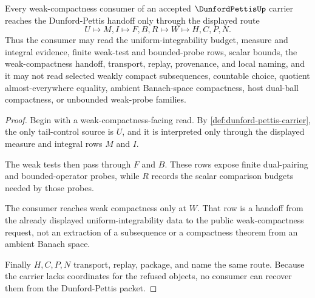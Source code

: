 \begin{theorem}
\label{thm:dunford-pettis-uniform-integrability-handoff}
Every weak-compactness consumer of an accepted $\DunfordPettisUp$ carrier reaches the Dunford-Pettis handoff only through the displayed route
$$
U \longmapsto M,I \longmapsto F,B,R \longmapsto W \longmapsto H,C,P,N .
$$
Thus the consumer may read the uniform-integrability budget, measure and integral evidence, finite weak-test and bounded-probe rows, scalar bounds, the weak-compactness handoff, transport, replay, provenance, and local naming, and it may not read selected weakly compact subsequences, countable choice, quotient almost-everywhere equality, ambient Banach-space compactness, host dual-ball compactness, or unbounded weak-probe families.
\end{theorem}
\begin{proof}
Begin with a weak-compactness-facing read. By \autoref{def:dunford-pettis-carrier}, the only tail-control source is $U$, and it is interpreted only through the displayed measure and integral rows $M$ and $I$.

The weak tests then pass through $F$ and $B$. These rows expose finite dual-pairing and bounded-operator probes, while $R$ records the scalar comparison budgets needed by those probes.

The consumer reaches weak compactness only at $W$. That row is a handoff from the already displayed uniform-integrability data to the public weak-compactness request, not an extraction of a subsequence or a compactness theorem from an ambient Banach space.

Finally $H,C,P,N$ transport, replay, package, and name the same route. Because the carrier lacks coordinates for the refused objects, no consumer can recover them from the Dunford-Pettis packet.
\end{proof}




